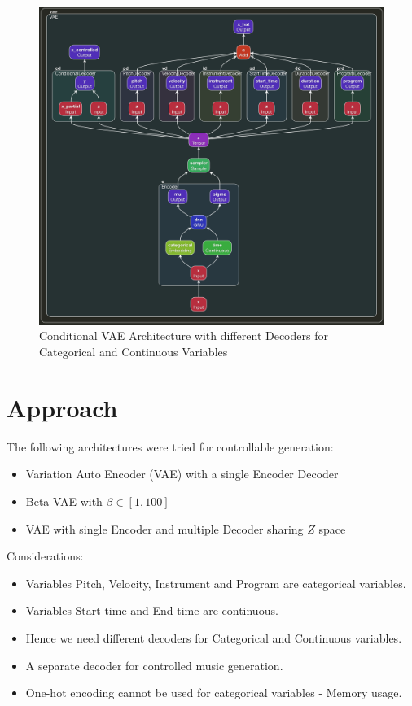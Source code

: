 \documentclass{article}
\begin{document}
\begin{center}
\begin{figure}
\includegraphics[width=1.0\linewidth]{midi_vae.png}
\caption{Conditional VAE Architecture with different Decoders for Categorical and Continuous Variables}
\end{figure}
\end{center}

\section{Approach}


The following architectures were tried for controllable generation:

\begin{itemize}
\item Variation Auto Encoder (VAE) with a single Encoder Decoder
\item Beta VAE with $\beta \in [1, 100]$
\item VAE with single Encoder and multiple Decoder sharing $Z$ space
\end{itemize}


Considerations:

\begin{itemize}
\item Variables Pitch, Velocity, Instrument and Program are categorical variables.
\item Variables Start time and End time are continuous.
\item Hence we need different decoders for Categorical and Continuous variables.
\item A separate decoder for controlled music generation.
\item One-hot encoding cannot be used for categorical variables - Memory usage.
\end{itemize}
\end{document}
